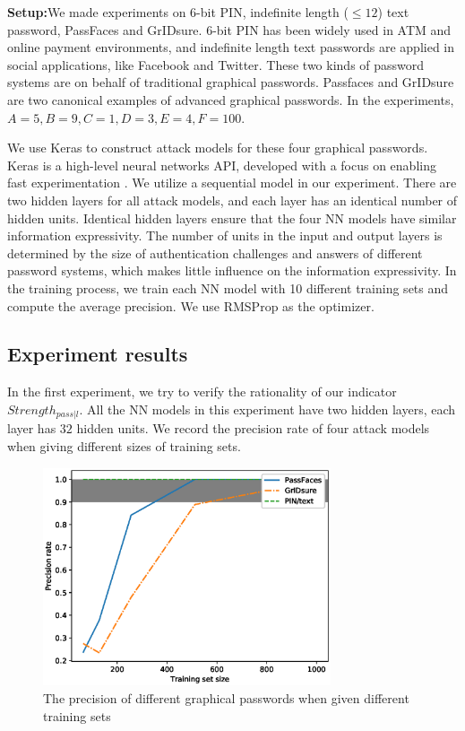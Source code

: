 \documentclass{article}
\begin{document}
  \textbf{Setup:}We made experiments on $6$-bit PIN, indefinite length ($\leq 12$) 
  text password, PassFaces and GrIDsure. $6$-bit PIN has been 
  widely used in ATM and online payment environments, and indefinite length text passwords are applied in social 
  applications, like Facebook and Twitter. These two kinds of password systems are on behalf of traditional 
  graphical passwords. Passfaces and GrIDsure are two canonical examples of advanced graphical passwords. In the 
  experiments, $A = 5, B = 9, C = 1, D = 3, E = 4, F=100$.
  
  We use Keras to construct attack models for these four graphical passwords. Keras is a high-level neural networks 
  API, developed with a focus on enabling fast experimentation \cite{chollet2015keras}. We utilize a sequential model in our experiment. 
  There are two hidden layers for all attack models, and each layer has an identical number of hidden units. Identical hidden layers ensure 
  that the four NN models have similar information expressivity. The number of units in the input and output 
  layers is determined by the size of authentication challenges and answers of different password systems, 
  which makes little influence on the information expressivity. In the training process, we train each NN model with 
  10 different training sets and compute the average precision. We use RMSProp as the optimizer.
  
  \subsection{Experiment results}
  In the first experiment, we try to verify the rationality of our indicator $Strength_{pass|l}$. All the NN 
  models in this experiment have two hidden layers, each layer has $32$ hidden units. We record the precision 
  rate of four attack models when giving different sizes of training sets. 
  \begin{figure}[htb]
    \centering
    \includegraphics[width=8.5cm]{line.eps}
    \caption{The precision of different graphical passwords when given different training sets}
    \label{fig:results}
  \end{figure}
  
\end{document}
